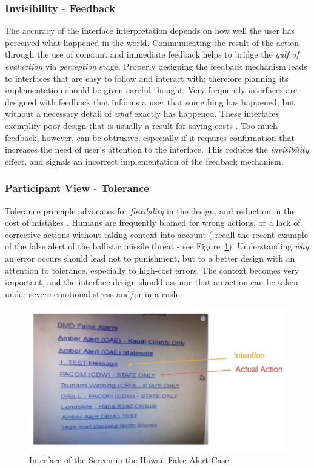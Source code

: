 \documentclass[12pt,letterpaper]{article}
\begin{document}
\subsubsection*{Invisibility - Feedback}
The accuracy of the interface interpretation depends on how well the user has perceived what happened in the world. Communicating the result of the action through the use of constant and immediate feedback helps to bridge the \textit{gulf of evaluation} via \textit{perception} stage. Properly designing the feedback mechanism leads to interfaces that are easy to follow and interact with; therefore planning its implementation should be given careful thought. Very frequently interfaces are designed with feedback that informs a user that something has happened, but without a necessary detail of \textit{what} exactly has happened. These interfaces exemplify poor design that is usually a result for saving costs \cite{norman2013design}. Too much feedback, however, can be obtrusive, especially if it requires confirmation that increases the need of user's attention to the interface. This reduces the \textit{invisibility} effect, and signals an incorrect implementation of the feedback mechanism.

\subsubsection*{Participant View - Tolerance}
Tolerance principle advocates for \textit{flexibility} in the design, and reduction in the cost of mistakes \cite{wiki:principles}. Humans are frequently blamed for wrong actions, or a lack of corrective actions without taking context into account ( recall the recent example of the false alert of the ballistic missile threat \cite{blog:fastcompany_hawaii} - see Figure~\ref{fig::0}). Understanding \textit{why} an error occurs should lead not to punishment, but to a better design with an attention to tolerance, especially to high-cost errors. The context becomes very important, and the interface design should assume that an action can be taken under severe emotional stress and/or in a rush.  

\begin{figure}[h]
\centering
\includegraphics[scale=.35]{figures/p3/tolerance.png}
\caption{Interface of the Screen in the Hawaii False Alert Case. }
\label{fig::0}
\end{figure}
\end{document}
